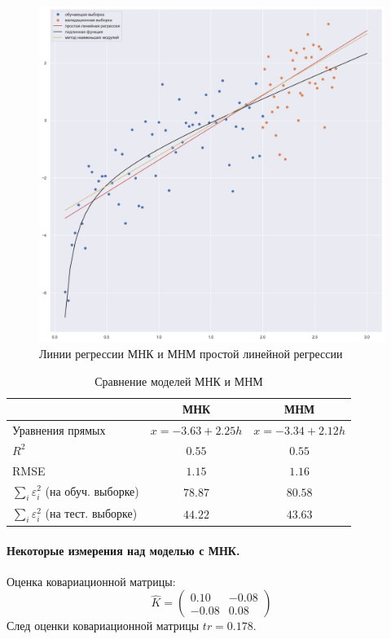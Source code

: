 \documentclass[a4paper,12pt]{article}
\begin{document}
\begin{figure}[H]
    \includegraphics[width=\linewidth]{src/img/простая_линейная регрессия.png}
    \caption{Линии регрессии МНК и МНМ простой линейной регрессии}
\end{figure}

\begin{table}[H]
    \begin{center}
    \begin{tabular}{|l|c|c|}
        \hline
        & МНК & МНМ \\ \hline
        Уравнения прямых & $x = -3.63 + 2.25 h$ & $x = -3.34 + 2.12 h$ \\ \hline
        $R^2$ & $0.55$ & $0.55$ \\ \hline
        RMSE & $1.15$ & $1.16$ \\ \hline
        $\sum\limits_i \varepsilon_i^2$ (на обуч. выборке) & $78.87$ & $80.58$ \\ \hline
        $\sum\limits_i \varepsilon_i^2$ (на тест. выборке) & $44.22$ & $43.63$ \\ \hline
    \end{tabular}
    \caption{Сравнение моделей МНК и МНМ}
    \end{center}
\end{table}


\paragraph{Некоторые измерения над моделью с МНК.\\}
Оценка ковариационной матрицы:
$$ \hat{K} = 
\begin{pmatrix}
    0.10 & -0.08\\
    -0.08 & 0.08
\end{pmatrix}
$$
След оценки ковариационной матрицы $tr = 0.178$.
\end{document}
